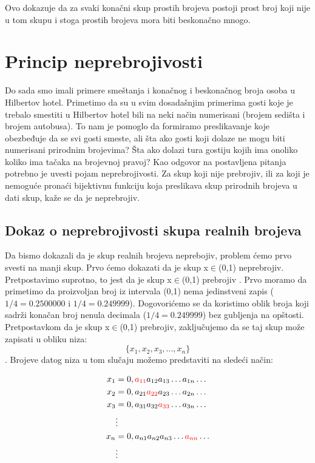 \documentclass[a4paper]{article}
\begin{document}
Ovo dokazuje da za svaki konačni skup prostih brojeva postoji prost broj koji nije u tom skupu i stoga prostih brojeva mora biti beskonačno mnogo.

\section{Princip neprebrojivosti}
\label{poglavlje:Princip neprebrojivosti}

Do sada smo imali primere smeštanja i konačnog i beskonačnog broja osoba u Hilbertov hotel. Primetimo da su u svim dosadašnjim primerima gosti koje je trebalo smestiti u Hilbertov hotel bili na neki način numerisani (brojem sedišta i brojem autobusa). To nam je pomoglo da formiramo preslikavanje koje obezbeđuje da se svi gosti smeste, ali šta ako gosti koji dolaze ne mogu biti numerisani prirodnim brojevima? Šta ako dolazi tura gostiju kojih ima onoliko koliko ima tačaka na brojevnoj pravoj? 
\newline
Kao odgovor na postavljena pitanja potrebno je uvesti pojam neprebrojivosti. Za skup koji nije prebrojiv, ili za koji je nemoguće pronaći bijektivnu funkciju koja preslikava skup prirodnih brojeva u dati skup, kaže se da je neprebrojiv. 
\subsection{Dokaz o neprebrojivosti skupa realnih brojeva}

Da bismo dokazali da je skup realnih brojeva neprebojiv, problem ćemo prvo svesti na manji skup. 
Prvo ćemo dokazati da je skup x$\in$(0,1) neprebrojiv.
\newline
Pretpostavimo suprotno, to jest da je skup x$\in$(0,1) prebrojiv \cite{matematicka_logika}. Prvo moramo da primetimo da proizvoljan broj iz intervala (0,1) nema jedinstveni zapis ($1/4=0.2500000$ i $1/4=0.249999$). Dogovorićemo se da koristimo oblik broja koji sadrži konačan broj nenula decimala ($1/4=0.249999$) bez gubljenja na opštosti. Pretpostavkom da je skup x$\in$(0,1) prebrojiv, zaključujemo da se taj skup može zapisati u obliku niza: $$\{x_{1},x_{2},x_{3},...,x_{n}\}$$.
\newline
Brojeve datog niza u tom slučaju možemo predstaviti na sledeći način:

\begin{align*}
    x_{1} & = 0,\color{red}a_{11}\color{black}a_{12}a_{13} \ldots a_{1n} \ldots \\
    x_{2} & = 0,a_{21}\color{red}a_{22}\color{black}a_{23} \ldots a_{2n} \ldots \\
    x_{3} & = 0,a_{31}a_{32}\color{red}a_{33}\color{black} \ldots a_{3n} \ldots \\
    & \vdots \\
    x_{n} & = 0,a_{n1}a_{n2}a_{n3} \ldots \color{red} a_{nn} \color{black} \ldots \\
    & \vdots 
\end{align*}\\
\end{document}
